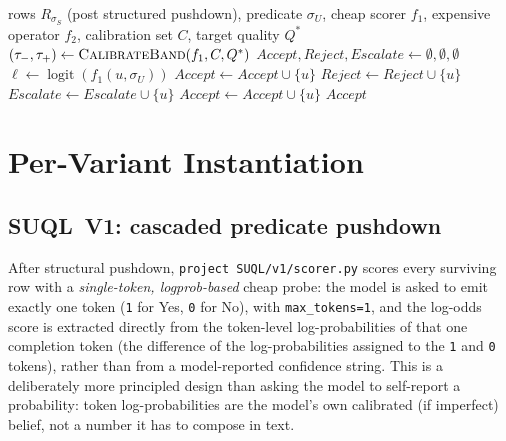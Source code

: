 \begin{algorithm}[h]
\caption{Two-level cascaded semantic filter}
\label{alg:cascade}
\begin{algorithmic}[1]
\Require rows $R_{\sigma_S}$ (post structured pushdown), predicate
$\sigma_U$, cheap scorer $f_1$, expensive operator $f_2$, calibration set
$C$, target quality $Q^\ast$
\State $(\tau_-, \tau_+) \gets \textsc{CalibrateBand}(f_1, C, Q^\ast)$
\State $\mathit{Accept}, \mathit{Reject}, \mathit{Escalate} \gets \emptyset,\emptyset,\emptyset$
  \State $\ell \gets \operatorname{logit}(f_1(u, \sigma_U))$
  \If{$\ell \ge \tau_+$}
    \State $\mathit{Accept} \gets \mathit{Accept} \cup \{u\}$
  \ElsIf{$\ell \le \tau_-$}
    \State $\mathit{Reject} \gets \mathit{Reject} \cup \{u\}$
  \Else
    \State $\mathit{Escalate} \gets \mathit{Escalate} \cup \{u\}$
  \EndIf
\EndFor
{} 
    \State $\mathit{Accept} \gets \mathit{Accept} \cup \{u\}$
  \EndIf
\EndFor
\State \Return $\mathit{Accept}$
\end{algorithmic}
\end{algorithm}

\section{Per-Variant Instantiation}
\label{sec:variant-instantiation}

\subsection{SUQL~V1: cascaded predicate pushdown}
\label{sec:suql-v1}
After structural pushdown, \texttt{project SUQL/v1/scorer.py} scores
every surviving row with a \emph{single-token, logprob-based} cheap
probe: the model is asked to emit exactly one token (\texttt{1} for Yes,
\texttt{0} for No), with \texttt{max\_tokens=1}, and the log-odds score
is extracted directly from the token-level log-probabilities of that one
completion token (the difference of the log-probabilities assigned to
the \texttt{1} and \texttt{0} tokens), rather than from a model-reported
confidence string. This is a deliberately more principled design than
asking the model to self-report a probability: token log-probabilities
are the model's own calibrated (if imperfect) belief, not a number it
has to compose in text.

